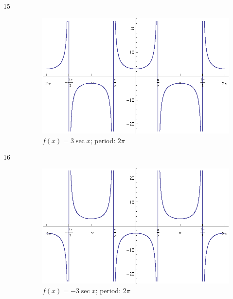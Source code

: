 \documentclass{exam}
\begin{document}
\begin{description}
      \item[15]
        \begin{figure}[H]
          \centering
          \includegraphics[scale=0.9]{exercise15.eps}
          \caption{$f(x) = 3 \sec x$; period: $2 \pi$}
        \end{figure}

      \item[16]
        \begin{figure}[H]
          \centering
          \includegraphics[scale=0.9]{exercise16.eps}
          \caption{$f(x) = -3 \sec x$; period: $2 \pi$}
        \end{figure}


\end{description}
\end{document}
